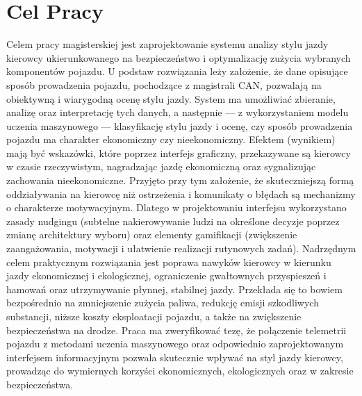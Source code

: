 \documentclass[
    bindingoffset=5mm,  %
    footnoteindent=3mm, %
    hyphenation=true    %
]{src/wut-thesis}
\begin{document}
\cleardoublepage %
\tableofcontents

\cleardoublepage %
\pagestyle{headings}

\section{Cel Pracy}
Celem pracy magisterskiej jest zaprojektowanie systemu analizy stylu jazdy
kierowcy ukierunkowanego na bezpieczeństwo i optymalizację zużycia wybranych
komponentów pojazdu. U podstaw rozwiązania leży założenie, że dane opisujące
sposób prowadzenia pojazdu, pochodzące z magistrali CAN, pozwalają na obiektywną
i wiarygodną ocenę stylu jazdy. System ma umożliwiać zbieranie, analizę oraz
interpretację tych danych, a następnie --- z wykorzystaniem modelu uczenia
maszynowego --- klasyfikację stylu jazdy i ocenę, czy sposób prowadzenia pojazdu
ma charakter ekonomiczny czy nieekonomiczny. Efektem (wynikiem) mają być
wskazówki, które poprzez interfejs graficzny, przekazywane są kierowcy w czasie
rzeczywistym, nagradzając jazdę ekonomiczną oraz sygnalizując zachowania
nieekonomiczne. Przyjęto przy tym założenie, że skuteczniejszą formą
oddziaływania na kierowcę niż ostrzeżenia i komunikaty o błędach są mechanizmy o
charakterze motywacyjnym. Dlatego w projektowaniu interfejsu wykorzystano zasady
nudgingu (subtelne nakierowywanie ludzi na określone decyzje poprzez zmianę
architektury wyboru) oraz elementy gamifikacji (zwiększenie zaangażowania,
motywacji i ułatwienie realizacji rutynowych zadań). Nadrzędnym celem
praktycznym rozwiązania jest poprawa nawyków kierowcy w kierunku jazdy
ekonomicznej i ekologicznej, ograniczenie gwałtownych przyspieszeń i hamowań
oraz utrzymywanie płynnej, stabilnej jazdy. Przekłada się to bowiem bezpośrednio
na zmniejszenie zużycia paliwa, redukcję emisji szkodliwych substancji, niższe
koszty eksploatacji pojazdu, a także na zwiększenie bezpieczeństwa na drodze.
Praca ma zweryfikować tezę, że połączenie telemetrii pojazdu z metodami uczenia
maszynowego oraz odpowiednio zaprojektowanym interfejsem informacyjnym pozwala
skutecznie wpływać na styl jazdy kierowcy, prowadząc do wymiernych korzyści
ekonomicznych, ekologicznych oraz w zakresie bezpieczeństwa.


\end{document}
